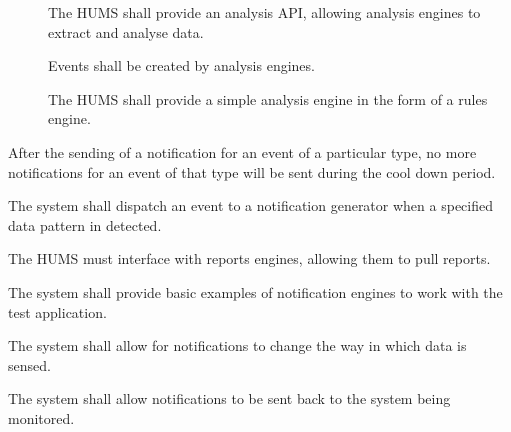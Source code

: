 \begin{description}[leftmargin=1.3cm, itemsep=0.3cm]
\begin{description}
 		\item[] The HUMS shall provide an analysis API, allowing 			analysis engines to extract and analyse data.
		
		\item[] Events shall be created by analysis engines.

 		\item[] The HUMS shall provide a simple analysis engine
 		in the form of a rules engine.
	\end{description}
	
	\item[\fr{8}]After the sending of a notification for an event of a particular 		type, no more notifications for an event of that type will be sent 				during the cool down period.
	\item[\fr{9}]The system shall dispatch an event to a notification generator 		when a specified data pattern in detected.
	\item[\fr{10}] The HUMS must interface with reports engines, allowing 			them to pull reports.
	\item[\fr{11}] The system shall provide basic examples of notification 			engines to work with the test application.
	\item[\fr{12}] The system shall allow for notifications to change the way in 		which data is sensed.
	 \item[\fr{13}] The system shall allow notifications to be sent back to the 		system being monitored.
\end{description}

